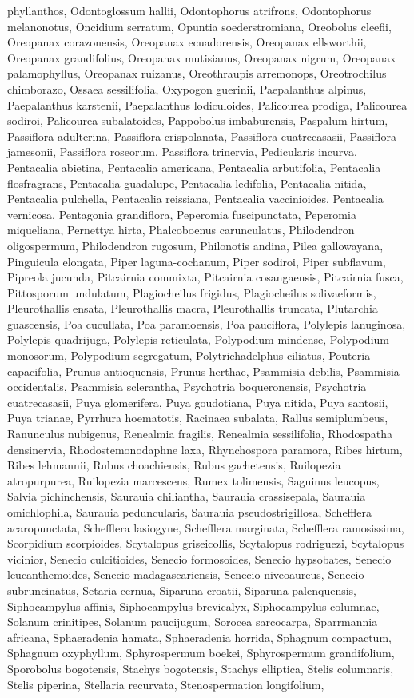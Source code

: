 \documentclass[]{article}
\begin{document}
phyllanthos, Odontoglossum hallii, Odontophorus atrifrons, Odontophorus melanonotus, Oncidium serratum, Opuntia soederstromiana, Oreobolus cleefii, Oreopanax corazonensis, Oreopanax ecuadorensis, Oreopanax ellsworthii, Oreopanax grandifolius, Oreopanax mutisianus, Oreopanax nigrum, Oreopanax palamophyllus, Oreopanax ruizanus, Oreothraupis arremonops, Oreotrochilus chimborazo, Ossaea sessilifolia, Oxypogon guerinii, Paepalanthus alpinus, Paepalanthus karstenii, Paepalanthus lodiculoides, Palicourea prodiga, Palicourea sodiroi, Palicourea subalatoides, Pappobolus imbaburensis, Paspalum hirtum, Passiflora adulterina, Passiflora crispolanata, Passiflora cuatrecasasii, Passiflora jamesonii, Passiflora roseorum, Passiflora trinervia, Pedicularis incurva, Pentacalia abietina, Pentacalia americana, Pentacalia arbutifolia, Pentacalia flosfragrans, Pentacalia guadalupe, Pentacalia ledifolia, Pentacalia nitida, Pentacalia pulchella, Pentacalia reissiana, Pentacalia vaccinioides, Pentacalia vernicosa, Pentagonia grandiflora, Peperomia fuscipunctata, Peperomia miqueliana, Pernettya hirta, Phalcoboenus carunculatus, Philodendron oligospermum, Philodendron rugosum, Philonotis andina, Pilea gallowayana, Pinguicula elongata, Piper laguna-cochanum, Piper sodiroi, Piper subflavum, Pipreola jucunda, Pitcairnia commixta, Pitcairnia cosangaensis, Pitcairnia fusca, Pittosporum undulatum, Plagiocheilus frigidus, Plagiocheilus solivaeformis, Pleurothallis ensata, Pleurothallis macra, Pleurothallis truncata, Plutarchia guascensis, Poa cucullata, Poa paramoensis, Poa pauciflora, Polylepis lanuginosa, Polylepis quadrijuga, Polylepis reticulata, Polypodium mindense, Polypodium monosorum, Polypodium segregatum, Polytrichadelphus ciliatus, Pouteria capacifolia, Prunus antioquensis, Prunus herthae, Psammisia debilis, Psammisia occidentalis, Psammisia sclerantha, Psychotria boqueronensis, Psychotria cuatrecasasii, Puya glomerifera, Puya goudotiana, Puya nitida, Puya santosii, Puya trianae, Pyrrhura hoematotis, Racinaea subalata, Rallus semiplumbeus, Ranunculus nubigenus, Renealmia fragilis, Renealmia sessilifolia, Rhodospatha densinervia, Rhodostemonodaphne laxa, Rhynchospora paramora, Ribes hirtum, Ribes lehmannii, Rubus choachiensis, Rubus gachetensis, Ruilopezia atropurpurea, Ruilopezia marcescens, Rumex tolimensis, Saguinus leucopus, Salvia pichinchensis, Saurauia chiliantha, Saurauia crassisepala, Saurauia omichlophila, Saurauia peduncularis, Saurauia pseudostrigillosa, Schefflera acaropunctata, Schefflera lasiogyne, Schefflera marginata, Schefflera ramosissima, Scorpidium scorpioides, Scytalopus griseicollis, Scytalopus rodriguezi, Scytalopus vicinior, Senecio culcitioides, Senecio formosoides, Senecio hypsobates, Senecio leucanthemoides, Senecio madagascariensis, Senecio niveoaureus, Senecio subruncinatus, Setaria cernua, Siparuna croatii, Siparuna palenquensis, Siphocampylus affinis, Siphocampylus brevicalyx, Siphocampylus columnae, Solanum crinitipes, Solanum paucijugum, Sorocea sarcocarpa, Sparrmannia africana, Sphaeradenia hamata, Sphaeradenia horrida, Sphagnum compactum, Sphagnum oxyphyllum, Sphyrospermum boekei, Sphyrospermum grandifolium, Sporobolus bogotensis, Stachys bogotensis, Stachys elliptica, Stelis columnaris, Stelis piperina, Stellaria recurvata, Stenospermation longifolium, 
\end{document}
